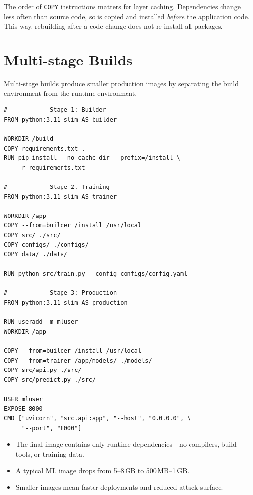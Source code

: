 \begin{remark}
The order of \texttt{COPY} instructions matters for layer caching.
Dependencies change less often than source code, so
 is copied and installed \emph{before} the
application code. This way, rebuilding after a code change does not
re-install all packages.
\end{remark}

\section{Multi-stage Builds}
\label{sec:multi-stage}

Multi-stage builds produce smaller production images by separating the
build environment from the runtime environment.

\begin{codeblock}[title=\textbf{Multi-stage Dockerfile for ML}]
\begin{verbatim}
# ---------- Stage 1: Builder ----------
FROM python:3.11-slim AS builder

WORKDIR /build
COPY requirements.txt .
RUN pip install --no-cache-dir --prefix=/install \
    -r requirements.txt

# ---------- Stage 2: Training ----------
FROM python:3.11-slim AS trainer

WORKDIR /app
COPY --from=builder /install /usr/local
COPY src/ ./src/
COPY configs/ ./configs/
COPY data/ ./data/

RUN python src/train.py --config configs/config.yaml

# ---------- Stage 3: Production ----------
FROM python:3.11-slim AS production

RUN useradd -m mluser
WORKDIR /app

COPY --from=builder /install /usr/local
COPY --from=trainer /app/models/ ./models/
COPY src/api.py ./src/
COPY src/predict.py ./src/

USER mluser
EXPOSE 8000
CMD ["uvicorn", "src.api:app", "--host", "0.0.0.0", \
     "--port", "8000"]
\end{verbatim}
\end{codeblock}

\begin{bestpractice}[title=\textbf{Multi-stage build benefits}]
\begin{itemize}
  \item The final image contains only runtime dependencies---no
    compilers, build tools, or training data.
  \item A typical ML image drops from 5--8\,GB to 500\,MB--1\,GB.
  \item Smaller images mean faster deployments and reduced attack
    surface.
\end{itemize}
\end{bestpractice}

